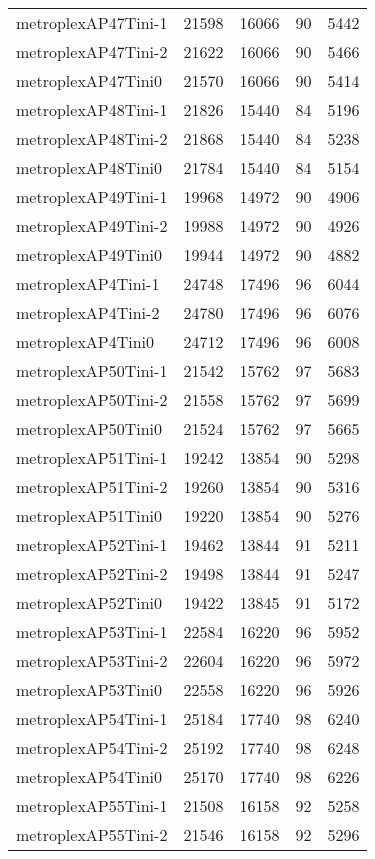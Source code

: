 \begin{tabular}{lrrrr}
metroplexAP47Tini-1 & 21598 & 16066 & 90 & 5442 \\
metroplexAP47Tini-2 & 21622 & 16066 & 90 & 5466 \\
metroplexAP47Tini0 & 21570 & 16066 & 90 & 5414 \\
metroplexAP48Tini-1 & 21826 & 15440 & 84 & 5196 \\
metroplexAP48Tini-2 & 21868 & 15440 & 84 & 5238 \\
metroplexAP48Tini0 & 21784 & 15440 & 84 & 5154 \\
metroplexAP49Tini-1 & 19968 & 14972 & 90 & 4906 \\
metroplexAP49Tini-2 & 19988 & 14972 & 90 & 4926 \\
metroplexAP49Tini0 & 19944 & 14972 & 90 & 4882 \\
metroplexAP4Tini-1 & 24748 & 17496 & 96 & 6044 \\
metroplexAP4Tini-2 & 24780 & 17496 & 96 & 6076 \\
metroplexAP4Tini0 & 24712 & 17496 & 96 & 6008 \\
metroplexAP50Tini-1 & 21542 & 15762 & 97 & 5683 \\
metroplexAP50Tini-2 & 21558 & 15762 & 97 & 5699 \\
metroplexAP50Tini0 & 21524 & 15762 & 97 & 5665 \\
metroplexAP51Tini-1 & 19242 & 13854 & 90 & 5298 \\
metroplexAP51Tini-2 & 19260 & 13854 & 90 & 5316 \\
metroplexAP51Tini0 & 19220 & 13854 & 90 & 5276 \\
metroplexAP52Tini-1 & 19462 & 13844 & 91 & 5211 \\
metroplexAP52Tini-2 & 19498 & 13844 & 91 & 5247 \\
metroplexAP52Tini0 & 19422 & 13845 & 91 & 5172 \\
metroplexAP53Tini-1 & 22584 & 16220 & 96 & 5952 \\
metroplexAP53Tini-2 & 22604 & 16220 & 96 & 5972 \\
metroplexAP53Tini0 & 22558 & 16220 & 96 & 5926 \\
metroplexAP54Tini-1 & 25184 & 17740 & 98 & 6240 \\
metroplexAP54Tini-2 & 25192 & 17740 & 98 & 6248 \\
metroplexAP54Tini0 & 25170 & 17740 & 98 & 6226 \\
metroplexAP55Tini-1 & 21508 & 16158 & 92 & 5258 \\
metroplexAP55Tini-2 & 21546 & 16158 & 92 & 5296 \\

\end{tabular}
